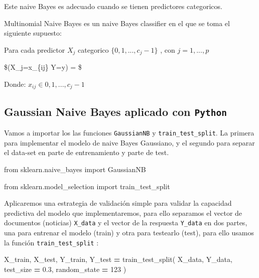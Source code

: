 \documentclass[
  11pt,
  a4paper,
]{article}
\newenvironment{Shaded}{\begin{snugshade}}{\end{snugshade}}
\newcommand{\DecValTok}[1]{\textcolor[rgb]{0.00,0.00,0.81}{#1}}
\newcommand{\FloatTok}[1]{\textcolor[rgb]{0.00,0.00,0.81}{#1}}
\newcommand{\ImportTok}[1]{#1}
\newcommand{\NormalTok}[1]{#1}
\newcommand{\OperatorTok}[1]{\textcolor[rgb]{0.81,0.36,0.00}{\textbf{#1}}}
\begin{document}
Este naive Bayes es adecuado cuando se tienen predictores categoricos.

Multinomial Naive Bayes es un naive Bayes classifier en el que se toma
el siguiente supuesto:

Para cada predictor \(X_j\) categorico
\(\lbrace 0 , 1,..., c_j-1 \rbrace\) , con \(j=1,...,p\)

\$(X\_j=x\_\{ij\} \textbar{} Y=y) =
\$

Donde: \(x_{ij} \in 0,1,..., c_j-1\)

\hypertarget{gaussian-naive-bayes-aplicado-con-python}{%
\subsection{\texorpdfstring{Gaussian Naive Bayes aplicado con
\texttt{Python}}{Gaussian Naive Bayes aplicado con Python}}\label{gaussian-naive-bayes-aplicado-con-python}}

Vamos a importar los las funciones \texttt{GaussianNB} y
\texttt{train\_test\_split}. La primera para implementar el modelo de
naive Bayes Gaussiano, y el segundo para separar el data-set en parte de
entrenamiento y parte de test.

\begin{Shaded}
\begin{Highlighting}[]

\ImportTok{from}\NormalTok{ sklearn.naive\_bayes }\ImportTok{import}\NormalTok{ GaussianNB}

\ImportTok{from}\NormalTok{ sklearn.model\_selection }\ImportTok{import}\NormalTok{ train\_test\_split}
\end{Highlighting}
\end{Shaded}

Aplicaremos una estrategia de validación simple para validar la
capacidad predictiva del modelo que implementaremos, para ello separamos
el vector de documentos (noticias) \texttt{X\_data} y el vector de la
respuesta \texttt{Y\_data} en dos partes, una para entrenar el modelo
(train) y otra para testearlo (test), para ello usamos la función
\texttt{train\_test\_split} :

\begin{Shaded}
\begin{Highlighting}[]
\NormalTok{X\_train, X\_test, Y\_train, Y\_test }\OperatorTok{=}\NormalTok{ train\_test\_split(}
\NormalTok{    X\_data,}
\NormalTok{    Y\_data,}
\NormalTok{    test\_size }\OperatorTok{=} \FloatTok{0.3}\NormalTok{,}
\NormalTok{    random\_state }\OperatorTok{=} \DecValTok{123}    
\NormalTok{)}
\end{Highlighting}
\end{Shaded}
\end{document}
